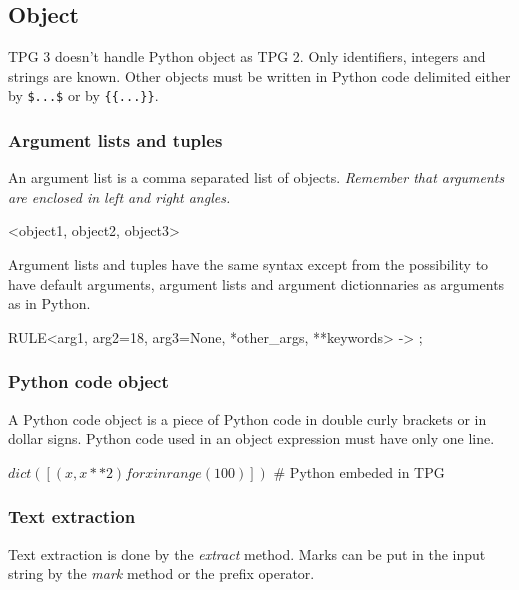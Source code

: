 \subsection{Object}                                             \label{parser:object}

TPG 3 doesn't handle Python object as TPG 2.
Only identifiers, integers and strings are known.
Other objects must be written in Python code delimited either by \verb!$...$! or by \verb!{{...}}!.

\subsubsection{Argument lists and tuples}

An argument list is a comma separated list of objects.
\emph{Remember that arguments are enclosed in left and right angles.}

\begin{verbatimtab}[4]
    <object1, object2, object3>
\end{verbatimtab}

Argument lists and tuples have the same syntax except from the possibility to have
default arguments, argument lists and argument dictionnaries as arguments as in Python.

\begin{verbatimtab}[4]
    RULE<arg1, arg2=18, arg3=None, *other_args, **keywords> -> ;
\end{verbatimtab}

\subsubsection{Python code object}

A Python code object is a piece of Python code in double curly brackets or in dollar signs.
Python code used in an object expression must have only one line.

\begin{verbatimtab}[4]
    $ dict([ (x,x**2) for x in range(100) ]) $ # Python embeded in TPG
\end{verbatimtab}

\subsubsection{Text extraction}

Text extraction is done by the \emph{extract} method.
Marks can be put in the input string by the \emph{mark} method or the prefix \emph{\@} operator.

